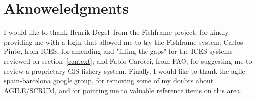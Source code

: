 \documentclass[11pt]{article} %
\begin{document}





\section{Aknoweledgments}
I would like to thank Henrik Degel, from the Fishframe project, for kindly providing me with a login that allowed me to try the Fishframe system; Carlos Pinto, from ICES, for amending and "filling the gaps" for the ICES systems reviewed on section~\ref{context}; and Fabio Carocci, from FAO, for suggesting me to review a proprietary GIS fishery system. Finally, I would like to thank the agile-spain-barcelona google group, for removing some of my doubts about AGILE/SCRUM, and for pointing me to valuable reference items on this area.
\clearpage
\end{document}
